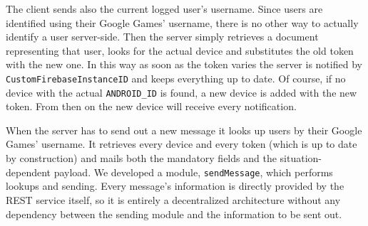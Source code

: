 The client sends also the current logged user's username. Since users are identified using their Google Games' username, there is no other way to actually identify a user server-side. Then the server simply retrieves a document representing that user, looks for the actual device and substitutes the old token with the new one. In this way as soon as the token varies the server is notified by \texttt{CustomFirebaseInstanceID} and keeps everything up to date. Of course, if no device with the actual \texttt{ANDROID\_ID} is found, a new device is added with the new token. From then on the new device will receive every notification.

When the server has to send out a new message it looks up users by their Google Games' username. It retrieves every device and every token (which is up to date by construction) and mails both the mandatory fields and the situation-dependent payload. We developed a module, \texttt{sendMessage}, which performs lookups and sending. Every message's information is directly provided by the REST service itself, so it is entirely a decentralized architecture without any dependency between the sending module and the information to be sent out.


